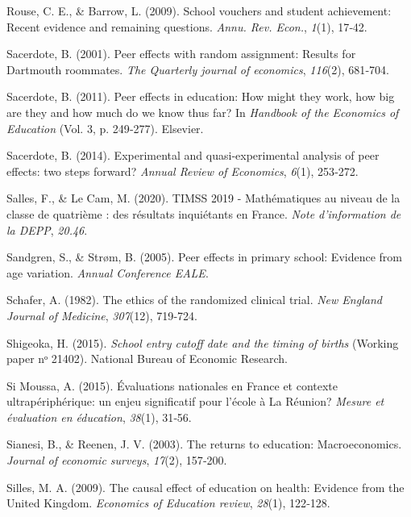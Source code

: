 \documentclass[
]{book}
\newlength{\cslhangindent}
\newlength{\cslentryspacingunit} %
\newenvironment{CSLReferences}[2] %
 {%
  \setlength{\parindent}{0pt}
  \ifodd #1
  \let\oldpar\par
  \def\par{\hangindent=\cslhangindent\oldpar}
  \fi
  \setlength{\parskip}{#2\cslentryspacingunit}
 }%
 {}
\begin{document}
\begin{CSLReferences}{1}{2}
\leavevmode{}%
Rouse, C. E., \& Barrow, L. (2009). School vouchers and student achievement: Recent evidence and remaining questions. \emph{Annu. Rev. Econ.}, \emph{1}(1), 17‑42.

\leavevmode{}%
Sacerdote, B. (2001). Peer effects with random assignment: Results for Dartmouth roommates. \emph{The Quarterly journal of economics}, \emph{116}(2), 681‑704.

\leavevmode{}%
Sacerdote, B. (2011). Peer effects in education: How might they work, how big are they and how much do we know thus far? In \emph{Handbook of the Economics of Education} (Vol. 3, p. 249‑277). Elsevier.

\leavevmode{}%
Sacerdote, B. (2014). Experimental and quasi-experimental analysis of peer effects: two steps forward? \emph{Annual Review of Economics}, \emph{6}(1), 253‑272.

\leavevmode{}%
Salles, F., \& Le Cam, M. (2020). TIMSS 2019 - Mathématiques au niveau de la classe de quatrième : des résultats inquiétants en France. \emph{Note d'information de la DEPP}, \emph{20.46}.

\leavevmode{}%
Sandgren, S., \& Strøm, B. (2005). Peer effects in primary school: Evidence from age variation. \emph{Annual Conference EALE}.

\leavevmode{}%
Schafer, A. (1982). The ethics of the randomized clinical trial. \emph{New England Journal of Medicine}, \emph{307}(12), 719‑724.

\leavevmode{}%
Shigeoka, H. (2015). \emph{School entry cutoff date and the timing of births} (Working paper nᵒ 21402). National Bureau of Economic Research.

\leavevmode{}%
Si Moussa, A. (2015). {É}valuations nationales en France et contexte ultrap{é}riph{é}rique: un enjeu significatif pour l'{é}cole {à} La R{é}union? \emph{Mesure et {é}valuation en {é}ducation}, \emph{38}(1), 31‑56.

\leavevmode{}%
Sianesi, B., \& Reenen, J. V. (2003). The returns to education: Macroeconomics. \emph{Journal of economic surveys}, \emph{17}(2), 157‑200.

\leavevmode{}%
Silles, M. A. (2009). The causal effect of education on health: Evidence from the United Kingdom. \emph{Economics of Education review}, \emph{28}(1), 122‑128.


\end{CSLReferences}
\end{document}
